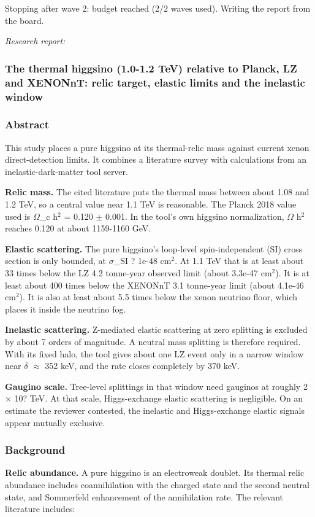 \documentclass[11pt,a4paper]{article}
\begin{document}
Stopping after wave 2: budget reached (2/2 waves used). Writing the report from the board.

\textit{Research report:}\par
\subsubsection*{The thermal higgsino (1.0-1.2 TeV) relative to Planck, LZ and XENONnT: relic target, elastic limits and the inelastic window}
\subsubsection*{Abstract}
This study places a pure higgsino at its thermal-relic mass against current xenon direct-detection limits. It combines a literature survey with calculations from an inelastic-dark-matter tool server.

\textbf{Relic mass.} The cited literature puts the thermal mass between about 1.08 and 1.2 TeV, so a central value near 1.1 TeV is reasonable. The Planck 2018 value used is $\Omega$\_c h$^2$ = 0.120 $\pm$ 0.001. In the tool's own higgsino normalization, $\Omega$ h$^2$ reaches 0.120 at about 1159-1160 GeV.

\textbf{Elastic scattering.} The pure higgsino's loop-level spin-independent (SI) cross section is only bounded, at $\sigma$\_SI ? 1e-48 cm$^2$. At 1.1 TeV that is at least about 33 times below the LZ 4.2 tonne-year observed limit (about 3.3e-47 cm$^2$). It is at least about 400 times below the XENONnT 3.1 tonne-year limit (about 4.1e-46 cm$^2$). It is also at least about 5.5 times below the xenon neutrino floor, which places it inside the neutrino fog.

\textbf{Inelastic scattering.} Z-mediated elastic scattering at zero splitting is excluded by about 7 orders of magnitude. A neutral mass splitting is therefore required. With its fixed halo, the tool gives about one LZ event only in a narrow window near $\delta$ $\approx$ 352 keV, and the rate closes completely by 370 keV.

\textbf{Gaugino scale.} Tree-level splittings in that window need gauginos at roughly 2 $\times$ 10? TeV. At that scale, Higgs-exchange elastic scattering is negligible. On an estimate the reviewer contested, the inelastic and Higgs-exchange elastic signals appear mutually exclusive.

\subsubsection*{Background}
\textbf{Relic abundance.} A pure higgsino is an electroweak doublet. Its thermal relic abundance includes coannihilation with the charged state and the second neutral state, and Sommerfeld enhancement of the annihilation rate. The relevant literature includes:
\end{document}
